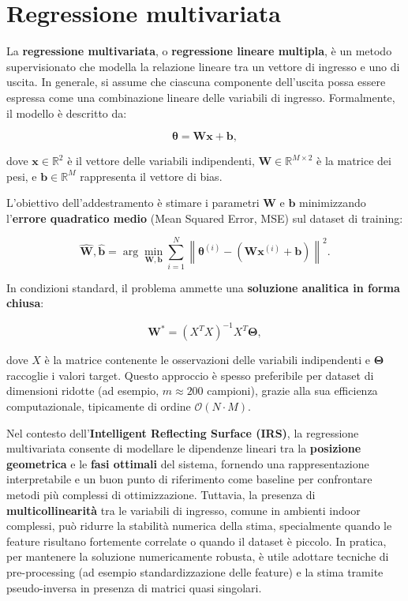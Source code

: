 \documentclass[12pt,a4paper]{report}
\begin{document}
\section{Regressione multivariata}
La \textbf{regressione multivariata}, o \textbf{regressione lineare
multipla}, è un metodo supervisionato che modella la relazione
lineare tra un vettore di ingresso e uno di uscita. In generale, si
assume che ciascuna componente dell'uscita possa essere espressa come
una combinazione lineare delle variabili di ingresso. Formalmente, il
modello è descritto da:

\begin{equation}
  \boldsymbol{\theta} = \mathbf{W}\mathbf{x} + \mathbf{b},
  \label{eq:regressione_lineare}
\end{equation}

dove $\mathbf{x} \in \mathbb{R}^2$ è il vettore delle variabili
indipendenti, $\mathbf{W} \in \mathbb{R}^{M \times 2}$ è la matrice
dei pesi, e $\mathbf{b} \in \mathbb{R}^M$ rappresenta il vettore di bias.

L'obiettivo dell'addestramento è stimare i parametri $\mathbf{W}$ e
$\mathbf{b}$ minimizzando l'\textbf{errore quadratico medio} (Mean
Squared Error, MSE) sul dataset di training:

\begin{equation}
  \hat{\mathbf{W}}, \hat{\mathbf{b}} =
  \arg\min_{\mathbf{W}, \mathbf{b}}
  \sum_{i=1}^{N}
  \left\|
  \boldsymbol{\theta}^{(i)} -
  \left(\mathbf{W}\mathbf{x}^{(i)} + \mathbf{b}\right)
  \right\|^2.
\end{equation}

In condizioni standard, il problema ammette una \textbf{soluzione
analitica in forma chiusa}:

\begin{equation}
  \mathbf{W}^* = (X^T X)^{-1} X^T \boldsymbol{\Theta},
\end{equation}

dove $X$ è la matrice contenente le osservazioni delle variabili
indipendenti e $\boldsymbol{\Theta}$ raccoglie i valori target.
Questo approccio è spesso preferibile per dataset di dimensioni
ridotte (ad esempio, $m \approx 200$ campioni), grazie alla sua
efficienza computazionale, tipicamente di ordine $\mathcal{O}(N \cdot M)$.

Nel contesto dell'\textbf{Intelligent Reflecting Surface (IRS)}, la
regressione multivariata consente di modellare le dipendenze lineari
tra la \textbf{posizione geometrica} e le \textbf{fasi ottimali} del
sistema, fornendo una rappresentazione interpretabile e un buon punto
di riferimento come baseline per confrontare metodi più complessi di
ottimizzazione. Tuttavia, la presenza di \textbf{multicollinearità}
tra le variabili di ingresso, comune in ambienti indoor complessi,
può ridurre la stabilità numerica della stima, specialmente quando le
feature risultano fortemente correlate o quando il dataset è piccolo.
In pratica, per mantenere la soluzione numericamente robusta, è utile
adottare tecniche di pre-processing (ad esempio standardizzazione
delle feature) e la stima tramite pseudo-inversa in presenza di
matrici quasi singolari.
\end{document}

